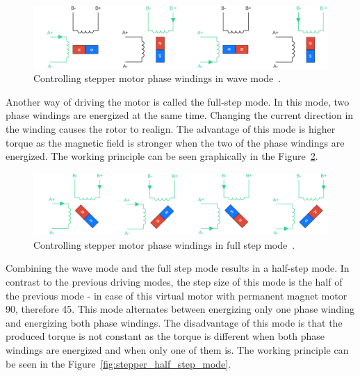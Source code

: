 \begin{figure}[H]
    \centering
    \includegraphics[width=\textwidth]{obrazky/wave_principle}
    \caption{Controlling stepper motor phase windings in wave mode~\cite{carmine_fiore_stepper_2021}.}
    \label{fig:stepper_wave_mode}
\end{figure}

\newpage
Another way of driving the motor is called the full-step mode.
In this mode, two phase windings are energized at the same time.
Changing the current direction in the winding causes the rotor to realign.
The advantage of this mode is higher torque as the magnetic field is stronger when the two of the phase windings are energized.
The working principle can be seen graphically in the Figure~\ref{fig:stepper_full_step_mode}.

\begin{figure}[H]
    \centering
    \includegraphics[width=\textwidth]{obrazky/full_step_principle}
    \caption{Controlling stepper motor phase windings in full step mode~\cite{carmine_fiore_stepper_2021}.}
    \label{fig:stepper_full_step_mode}
\end{figure}

Combining the wave mode and the full step mode results in a half-step mode.
In contrast to the previous driving modes, the step size of this mode is the half of the previous mode - in case of this virtual motor with permanent magnet motor 90\textdegree, therefore 45\textdegree.
This mode alternates between energizing only one phase winding and energizing both phase windings.
The disadvantage of this mode is that the produced torque is not constant as the torque is different when both phase windings are energized and when only one of them is.
The working principle can be seen in the Figure~\ref{fig:stepper_half_step_mode}.


